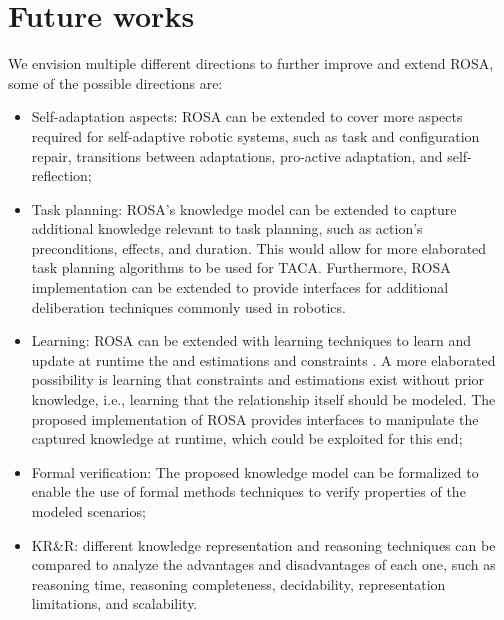 


\section{Future works}

We envision multiple different directions to further improve and extend ROSA, some of the possible directions are:
\begin{itemize}
    \item Self-adaptation aspects: ROSA can be extended to cover more aspects required for self-adaptive robotic systems, such as task and configuration repair, transitions between adaptations, pro-active adaptation, and self-reflection;
    \item Task planning: ROSA's knowledge model can be extended to capture additional knowledge relevant to task planning, such as action's preconditions, effects, and duration. This would allow for more elaborated task planning algorithms to be used for TACA. Furthermore, ROSA implementation can be extended to provide interfaces for additional deliberation techniques commonly used in robotics.
    \item Learning: ROSA can be extended with learning techniques to learn and update at runtime the  and  estimations and constraints . A more elaborated possibility is learning that constraints and estimations exist without prior knowledge, i.e., learning that the relationship itself should be modeled. The proposed implementation of ROSA provides interfaces to manipulate the captured knowledge at runtime, which could be exploited for this end;
    \item Formal verification: The proposed knowledge model can be formalized to enable the use of formal methods techniques to verify properties of the modeled scenarios;
    \item KR\&R: different knowledge representation and reasoning techniques can be compared to analyze the advantages and disadvantages of each one, such as reasoning time, reasoning completeness, decidability, representation limitations, and scalability.
\end{itemize}
